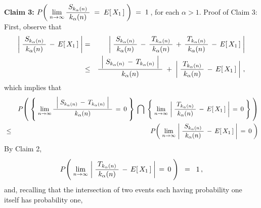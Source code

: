 \begin{enumerate}
\vskip 0.8cm
\noindent
\textbf{Claim 3:}\quad\quad
$P\!\left(\;
	\underset{n\rightarrow\infty}{\lim}\,
	\dfrac{{\color{white}.}S_{k_{\alpha}(n)}{\color{white}.}}{k_{\alpha}(n)} \;=\; E[\,X_{1}\,]
	\;\right)
\;=\;1$\,, for each $\alpha > 1$.
\vskip 0.3cm
\noindent
Proof of Claim 3:\quad
First, observe that
\begin{eqnarray*}
\left\vert\;\dfrac{{\color{white}.}S_{k_{\alpha}(n)}{\color{white}.}}{k_{\alpha}(n)} \,-\, E[\,X_{1}\,]\;\right\vert
& = &
	\left\vert\;
		\dfrac{{\color{white}.}S_{k_{\alpha}(n)}{\color{white}.}}{k_{\alpha}(n)}
		\,-\,
		\dfrac{{\color{white}.}T_{k_{\alpha}(n)}{\color{white}.}}{k_{\alpha}(n)}
		\,+\,
		\dfrac{{\color{white}.}T_{k_{\alpha}(n)}{\color{white}.}}{k_{\alpha}(n)}
		\,-\,
		E[\,X_{1}\,]
		\;\right\vert
\\
& \leq &
	\dfrac{
		{\color{white}.}
		\left\vert\;
			S_{k_{\alpha}(n)} \,\overset{{\color{white}.}}{-}\, T_{k_{\alpha}(n)}
			\;\right\vert
		{\color{white}.}
		}{
		k_{\alpha}(n)
		}
	\;+\;
	\left\vert\;
		\dfrac{{\color{white}.}T_{k_{\alpha}(n)}{\color{white}.}}{k_{\alpha}(n)}
		\,-\,
		E[\,X_{1}\,]
		\;\right\vert\,,
\end{eqnarray*}
which implies that
\begin{eqnarray*}
&&
	P\!\left(\;
		\left\{\;
			\underset{n\rightarrow\infty}{\lim}\,
			\dfrac{{\color{white}.}
				\left\vert\;
					S_{k_{\alpha}(n)} \,\overset{{\color{white}.}}{-}\, T_{k_{\alpha}(n)}
					\;\right\vert
				{\color{white}.}}{
				k_{\alpha}(n)
				}
			\,=\, 0
			\;\right\}
	\;\bigcap\;
		\left\{\;
			\overset{{\color{white}\textnormal{\Large1}}}{\underset{n\rightarrow\infty}{\lim}}\,
			\left\vert\;
			\dfrac{{\color{white}.}T_{k_{\alpha}(n)}{\color{white}.}}{k_{\alpha}(n)}
			\,-\,
			E[\,X_{1}\,]
			\;\right\vert
			\,=\, 0
			\;\right\}
	\;\right)
\\
& \leq &
	P\!\left(\;
		\underset{n\rightarrow\infty}{\lim}\,
		\left\vert\;\dfrac{{\color{white}.}S_{k_{\alpha}(n)}{\color{white}.}}{k_{\alpha}(n)} \,-\, E[\,X_{1}\,]\;\right\vert
		\,=\, 0
		\;\right)
\end{eqnarray*}
By Claim 2,
\begin{equation*}
P\!\left(\;
	\overset{{\color{white}\textnormal{\Large1}}}{\underset{n\rightarrow\infty}{\lim}}\,
	\left\vert\;
	\dfrac{{\color{white}.}T_{k_{\alpha}(n)}{\color{white}.}}{k_{\alpha}(n)}
	\,-\,
	E[\,X_{1}\,]
	\;\right\vert
	\,=\, 0
	\;\right)
\;\; = \;\; 1\,,
\end{equation*}
and, recalling that the intersection of two events each having probability one itself has probability one,

\end{enumerate}

